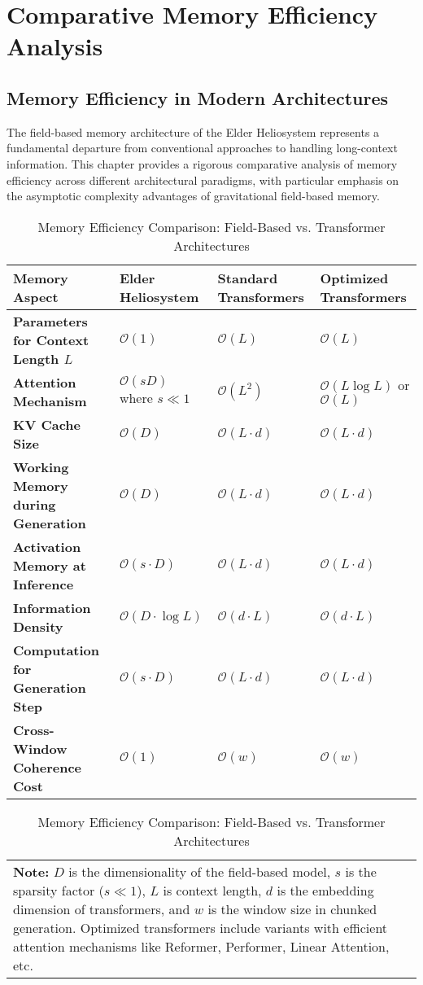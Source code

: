 \chapter{Comparative Memory Efficiency Analysis}

\section{Memory Efficiency in Modern Architectures}

The field-based memory architecture of the Elder Heliosystem represents a fundamental departure from conventional approaches to handling long-context information. This chapter provides a rigorous comparative analysis of memory efficiency across different architectural paradigms, with particular emphasis on the asymptotic complexity advantages of gravitational field-based memory.

\begin{table}[ht]
\centering
\caption{Memory Efficiency Comparison: Field-Based vs. Transformer Architectures}
\begin{tabular}{|p{3.5cm}|p{3.5cm}|p{3.5cm}|p{3.5cm}|}
\hline
\textbf{Memory Aspect} & \textbf{Elder Heliosystem} & \textbf{Standard Transformers} & \textbf{Optimized Transformers} \\
\hline
\textbf{Parameters for Context Length $L$} & $\mathcal{O}(1)$ & $\mathcal{O}(L)$ & $\mathcal{O}(L)$ \\
\hline
\textbf{Attention Mechanism} & $\mathcal{O}(sD)$ where $s \ll 1$ & $\mathcal{O}(L^2)$ & $\mathcal{O}(L \log L)$ or $\mathcal{O}(L)$ \\
\hline
\textbf{KV Cache Size} & $\mathcal{O}(D)$ & $\mathcal{O}(L \cdot d)$ & $\mathcal{O}(L \cdot d)$ \\
\hline
\textbf{Working Memory during Generation} & $\mathcal{O}(D)$ & $\mathcal{O}(L \cdot d)$ & $\mathcal{O}(L \cdot d)$ \\
\hline
\textbf{Activation Memory at Inference} & $\mathcal{O}(s \cdot D)$ & $\mathcal{O}(L \cdot d)$ & $\mathcal{O}(L \cdot d)$ \\
\hline
\textbf{Information Density} & $\mathcal{O}(D \cdot \log L)$ & $\mathcal{O}(d \cdot L)$ & $\mathcal{O}(d \cdot L)$ \\
\hline
\textbf{Computation for Generation Step} & $\mathcal{O}(s \cdot D)$ & $\mathcal{O}(L \cdot d)$ & $\mathcal{O}(L \cdot d)$ \\
\hline
\textbf{Cross-Window Coherence Cost} & $\mathcal{O}(1)$ & $\mathcal{O}(w)$ & $\mathcal{O}(w)$ \\
\hline
\end{tabular}

\begin{tabular}{p{15cm}}
\textbf{Note:} $D$ is the dimensionality of the field-based model, $s$ is the sparsity factor ($s \ll 1$), $L$ is context length, $d$ is the embedding dimension of transformers, and $w$ is the window size in chunked generation. Optimized transformers include variants with efficient attention mechanisms like Reformer, Performer, Linear Attention, etc.
\end{tabular}
\end{table}

